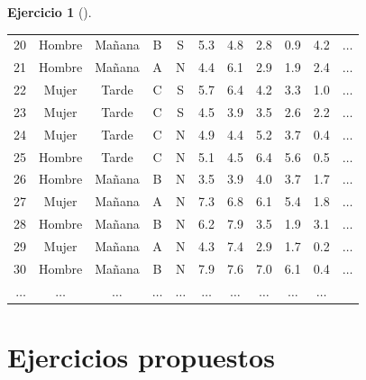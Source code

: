 \documentclass[
  a4paper,
]{scrreport}
\theoremstyle{definition}
\newtheorem{exercise}{Ejercicio}[chapter]
\theoremstyle{remark}
\begin{document}
\begin{exercise}[]
\begin{enumerate}
\begin{tcolorbox}
\begin{tabular}{r|cccccccccc}
      20 & Hombre & Mañana & B & S & 5.3 & 4.8 & 2.8 & 0.9 & 4.2 & $\dots$ \\
      21 & Hombre & Mañana & A & N & 4.4 & 6.1 & 2.9 & 1.9 & 2.4 & $\dots$ \\
      22 & Mujer & Tarde & C & S & 5.7 & 6.4 & 4.2 & 3.3 & 1.0 & $\dots$ \\
      23 & Mujer & Tarde & C & S & 4.5 & 3.9 & 3.5 & 2.6 & 2.2 & $\dots$ \\
      24 & Mujer & Tarde & C & N & 4.9 & 4.4 & 5.2 & 3.7 & 0.4 & $\dots$ \\
      25 & Hombre & Tarde & C & N & 5.1 & 4.5 & 6.4 & 5.6 & 0.5 & $\dots$ \\
      26 & Hombre & Mañana & B & N & 3.5 & 3.9 & 4.0 & 3.7 & 1.7 & $\dots$ \\
      27 & Mujer & Mañana & A & N & 7.3 & 6.8 & 6.1 & 5.4 & 1.8 & $\dots$ \\
      28 & Hombre & Mañana & B & N & 6.2 & 7.9 & 3.5 & 1.9 & 3.1 & $\dots$ \\
      29 & Mujer & Mañana & A & N & 4.3 & 7.4 & 2.9 & 1.7 & 0.2 & $\dots$ \\
      30 & Hombre & Mañana & B & N & 7.9 & 7.6 & 7.0 & 6.1 & 0.4 & $\dots$ \\
      $\dots$ & $\dots$ & $\dots$ & $\dots$ & $\dots$ & $\dots$ & $\dots$ & $\dots$ & $\dots$ & $\dots$ &  \\
  \end{tabular}

  \end{tcolorbox}
\end{enumerate}

\end{exercise}

\section{Ejercicios propuestos}\label{ejercicios-propuestos}
\end{document}
